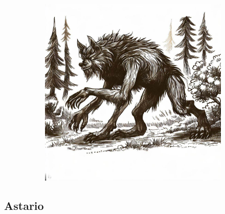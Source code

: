 \documentclass[11pt, twoside]{article}
\begin{document}
\begin{figure}[H]
\begin{subfigure}{0.3\textwidth}
  \end{subfigure}%
  \begin{subfigure}{0.3\textwidth}
    \centering
    \includegraphics[width=0.99\linewidth]{wolf3.jpeg}
  \end{subfigure}
\end{figure}

\newpage

\subsection{Astario}
\label{sec:org5939503}
\end{document}
